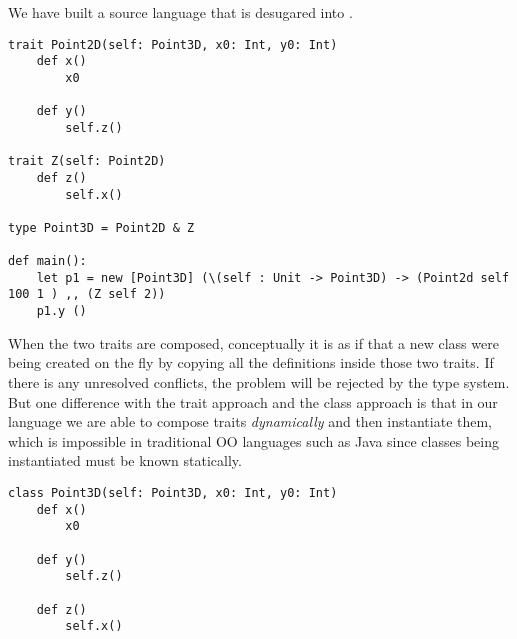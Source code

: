 We have built a source language that is desugared into \namedis.

\begin{lstlisting}
trait Point2D(self: Point3D, x0: Int, y0: Int)
    def x()
        x0

    def y()
        self.z()

trait Z(self: Point2D)
    def z()
        self.x()

type Point3D = Point2D & Z

def main():
    let p1 = new [Point3D] (\(self : Unit -> Point3D) -> (Point2d self 100 1 ) ,, (Z self 2))
    p1.y ()
\end{lstlisting}

When the two traits are composed, conceptually it is as if that a new class were
being created on the fly by copying all the definitions inside those two traits.
If there is any unresolved conflicts, the problem will be rejected by the type
system. But one difference with the trait approach and the class approach is
that in our language we are able to compose traits \emph{dynamically} and then
instantiate them, which is impossible in traditional OO languages such as Java
since classes being instantiated must be known statically.

\begin{lstlisting}
class Point3D(self: Point3D, x0: Int, y0: Int)
    def x()
        x0

    def y()
        self.z()

    def z()
        self.x()
\end{lstlisting}


